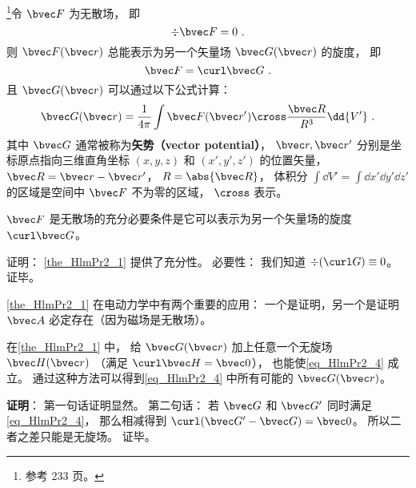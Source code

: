 
\begin{issues}
\issueTODO
\end{issues}


\begin{theorem}{}\label{the_HlmPr2_1}
\footnote{参考 \cite{GriffE} 233 页。}令 $\bvec F$ 为无散场， 即
\begin{equation}
\div \bvec F = 0~.
\end{equation}
则 $\bvec F(\bvec r)$ 总能表示为另一个矢量场 $\bvec G(\bvec r)$ 的旋度， 即
\begin{equation}\label{eq_HlmPr2_4}
\bvec F = \curl \bvec G~.
\end{equation}
且 $\bvec G(\bvec r)$ 可以通过以下公式计算：
\begin{equation}\label{eq_HlmPr2_1}
\bvec G(\bvec r) = \frac{1}{4\pi}\int \bvec F(\bvec r') \cross \frac{\bvec R}{R^3} \dd{V'}~.
\end{equation}
其中 $\bvec G$ 通常被称为\textbf{矢势（vector potential）}， $\bvec r, \bvec r'$ 分别是坐标原点指向三维直角坐标 $(x, y, z)$ 和 $(x', y', z')$ 的位置矢量， $\bvec R = \bvec r - \bvec r'$， $R = \abs{\bvec R}$， 体积分 $\int\dd{V'} = \int\dd{x'}\dd{y'}\dd{z'}$ 的区域是空间中 $\bvec F$ 不为零的区域， $\cross$ 表示。
\end{theorem}

\begin{corollary}{}
$\bvec F$ 是无散场的充分必要条件是它可以表示为另一个矢量场的旋度 $\curl \bvec G$。
\end{corollary}
证明： \autoref{the_HlmPr2_1} 提供了充分性。 必要性： 我们知道 $\div (\curl G) \equiv 0$。%
证毕。

\autoref{the_HlmPr2_1} 在电动力学中有两个重要的应用： 一个是证明，另一个是证明 $\bvec A$ 必定存在（因为磁场是无散场）。

\begin{corollary}{}\label{cor_HlmPr2_1}
在\autoref{the_HlmPr2_1} 中， 给 $\bvec G(\bvec r)$ 加上任意一个无旋场 $\bvec H(\bvec r)$ （满足 $\curl \bvec H = \bvec 0$）， 也能使\autoref{eq_HlmPr2_4} 成立。 通过这种方法可以得到\autoref{eq_HlmPr2_4} 中所有可能的 $\bvec G(\bvec r)$。
\end{corollary}
\textbf{证明}： 第一句话证明显然。 第二句话： 若 $\bvec G$ 和 $\bvec G'$ 同时满足\autoref{eq_HlmPr2_4}， 那么相减得到 $\curl (\bvec G' - \bvec G) = \bvec 0$。 所以二者之差只能是无旋场。 证毕。

